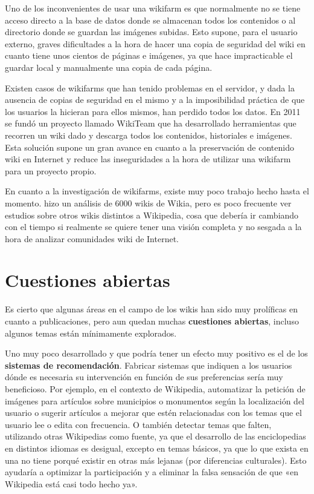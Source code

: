 \documentclass[11pt,onecolumn]{article}
\begin{document}
Uno de los inconvenientes de usar una wikifarm es que normalmente no se tiene acceso directo a la base de datos donde se almacenan todos los contenidos o al directorio donde se guardan las imágenes subidas. Esto supone, para el usuario externo, graves dificultades a la hora de hacer una copia de seguridad del wiki en cuanto tiene unos cientos de páginas e imágenes, ya que hace impracticable el guardar local y manualmente una copia de cada página.

Existen casos de wikifarms que han tenido problemas en el servidor, y dada la ausencia de copias de seguridad en el mismo y a la imposibilidad práctica de que los usuarios la hicieran para ellos mismos, han perdido todos los datos. En 2011 se fundó un proyecto llamado WikiTeam que ha desarrollado herramientas que recorren un wiki dado y descarga todos los contenidos, historiales e imágenes. Esta solución supone un gran avance en cuanto a la preservación de contenido wiki en Internet y reduce las inseguridades a la hora de utilizar una wikifarm para un proyecto propio.

En cuanto a la investigación de wikifarms, existe muy poco trabajo hecho hasta el momento. \citep{kittur2010} hizo un análisis de 6000 wikis de Wikia, pero es poco frecuente ver estudios sobre otros wikis distintos a Wikipedia, cosa que debería ir cambiando con el tiempo si realmente se quiere tener una visión completa y no sesgada a la hora de analizar comunidades wiki de Internet.

\clearpage

\section{Cuestiones abiertas}


Es cierto que algunas áreas en el campo de los wikis han sido muy prolíficas en cuanto a publicaciones, pero aun quedan muchas \textbf{cuestiones abiertas}, incluso algunos temas están mínimamente explorados.


Uno muy poco desarrollado y que podría tener un efecto muy positivo es el de los \textbf{sistemas de recomendación}. Fabricar sistemas que indiquen a los usuarios dónde es necesaria su intervención en función de sus preferencias sería muy beneficioso. Por ejemplo, en el contexto de Wikipedia, automatizar la petición de imágenes para artículos sobre municipios o monumentos según la localización del usuario o sugerir artículos a mejorar que estén relacionadas con los temas que el usuario lee o edita con frecuencia. O también detectar temas que falten, utilizando otras Wikipedias como fuente, ya que el desarrollo de las enciclopedias en distintos idiomas es desigual, excepto en temas básicos, ya que lo que exista en una no tiene porqué existir en otras más lejanas (por diferencias culturales). Esto ayudaría a optimizar la participación y a eliminar la falsa sensación de que «en Wikipedia está casi todo hecho ya».
\end{document}
